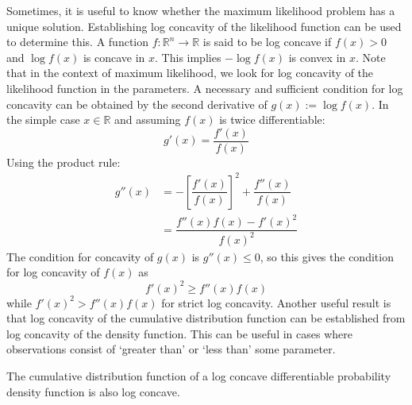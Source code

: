 \documentclass[11pt]{report} %
\begin{document}
Sometimes, it is useful to know whether the maximum likelihood problem has a unique solution. Establishing log concavity of the likelihood function can be used to determine this. A function $f: \mathbb{R}^{n}\to\mathbb{R}$ is said to be log concave if $f\left(x\right) > 0$ and $\log f\left(x\right)$ is concave in $x$. This implies $-\log f\left(x\right)$ is convex in $x$. Note that in the context of maximum likelihood, we look for log concavity of the likelihood function in the parameters. A necessary and sufficient condition for log concavity can be obtained by the second derivative of $g\left(x\right) := \log f\left(x\right)$. In the simple case $x\in\mathbb{R}$ and assuming $f\left(x\right)$ is twice differentiable:
\begin{equation}
g'\left(x\right) = \dfrac{f'\left(x\right)}{f\left(x\right)}
\end{equation}
Using the product rule:
\begin{align}
g''\left(x\right) &= -\left[\dfrac{f'\left(x\right)}{f\left(x\right)}\right]^{2} + \dfrac{f''\left(x\right)}{f\left(x\right)} \\
&= \dfrac{f''\left(x\right)f\left(x\right) - f'\left(x\right)^{2}}{f\left(x\right)^{2}}
\end{align}
The condition for concavity of $g\left(x\right)$ is $g''\left(x\right) \leq 0$, so this gives the condition for log concavity of $f\left(x\right)$ as
\begin{equation}
f'\left(x\right)^{2} \geq f''\left(x\right)f\left(x\right)
\end{equation}
while $f'\left(x\right)^{2} > f''\left(x\right)f\left(x\right)$ for strict log concavity. Another useful result is that log concavity of the cumulative distribution function can be established from log concavity of the density function. This can be useful in cases where observations consist of `greater than' or `less than' some parameter.
\begin{theorem}
The cumulative distribution function of a log concave differentiable probability density function is also log concave.
\end{theorem}
\end{document}

